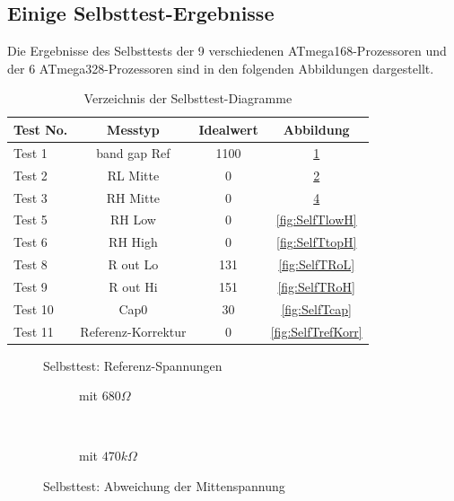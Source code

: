 \subsection{Einige Selbsttest-Ergebnisse}

Die Ergebnisse des Selbsttests der 9 verschiedenen ATmega168-Prozessoren und der 6 ATmega328-Prozessoren
sind in den folgenden Abbildungen dargestellt. 

\begin{table}[H]
  \begin{center}
    \begin{tabular}{| l | c | c | c |}
    \hline
Test No. &  Messtyp    & Idealwert & Abbildung \\
    \hline
    \hline
Test 1 & band gap Ref  & 1100 & \ref{fig:SelfTref} \\
    \hline
Test 2 & RL Mitte & 0 & \ref{fig:SelfTMitL} \\
    \hline
Test 3 & RH Mitte & 0 & \ref{fig:SelfTMitH} \\
    \hline
Test 5 & RH Low &  0 & \ref{fig:SelfTlowH} \\
    \hline
Test 6 & RH High & 0 & \ref{fig:SelfTtopH} \\
    \hline
Test 8 & R out Lo & 131 & \ref{fig:SelfTRoL} \\
    \hline
Test 9 & R out Hi & 151 & \ref{fig:SelfTRoH} \\
    \hline
Test 10 & Cap0  & 30 & \ref{fig:SelfTcap} \\
    \hline
Test 11 & Referenz-Korrektur  & 0 & \ref{fig:SelfTrefKorr} \\
    \hline
    \end{tabular}
  \end{center}
  \caption{Verzeichnis der Selbsttest-Diagramme}
  \label{tab:test_m168} 
\end{table}

\begin{figure}[H]
  \centering
  
  \caption{Selbsttest: Referenz-Spannungen}
  \label{fig:SelfTref}
\end{figure}

\begin{figure}[H]
  \begin{subfigure}[b]{9cm}
    \centering
    \resizebox{9cm}{!}{}
    \caption{mit \(680 \Omega\)}
    \label{fig:SelfTMitL}
  \end{subfigure}
  ~
  \begin{subfigure}[b]{9cm}
    \centering
    \resizebox{9cm}{!}{}
    \caption{mit \(470 k\Omega\)}
    \label{fig:SelfTMitH}
  \end{subfigure}
  \caption{Selbsttest: Abweichung der Mittenspannung}
\end{figure}

